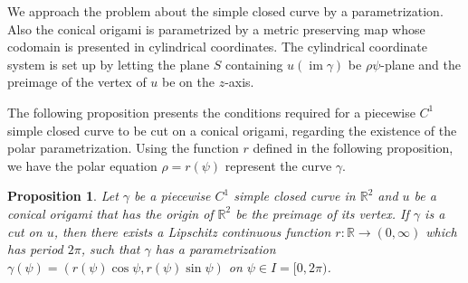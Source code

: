 \documentclass{amsart}
\theoremstyle{plain}
\newtheorem{proposition}[theorem]{Proposition}
\theoremstyle{definition}
\theoremstyle{remark}
\DeclareMathOperator{\im}{im}
\begin{document}
We approach the problem about the simple closed curve by a parametrization.
Also the conical origami is parametrized by a metric preserving map whose codomain is presented in cylindrical coordinates.
The cylindrical coordinate system is set up by letting the plane $S$ containing $u(\im \gamma)$ be $\rho\psi$-plane and the preimage of the vertex of $u$ be on the $z$-axis.

The following proposition presents the conditions required for a piecewise $C^1$ simple closed curve to be cut on a conical origami, regarding the existence of the polar parametrization.
Using the function $r$ defined in the following proposition, we have the polar equation $\rho=r(\psi)$ represent the curve $\gamma$.



\begin{proposition}\label{2.1} %
Let $\gamma$ be a piecewise $C^1$ simple closed curve in $\mathbb{R}^2$ and $u$ be a conical origami that has the origin of $\mathbb{R}^2$ be the preimage of its vertex.
If $\gamma$ is a cut on $u$, then there exists a Lipschitz continuous function $r \colon \mathbb{R}\to(0,\infty)$ which has period $2\pi$, such that $\gamma$ has a parametrization $\gamma(\psi)=(r(\psi)\cos\psi,r(\psi)\sin\psi)$ on $\psi\in I=[0,2\pi)$.
\end{proposition}
\end{document}
